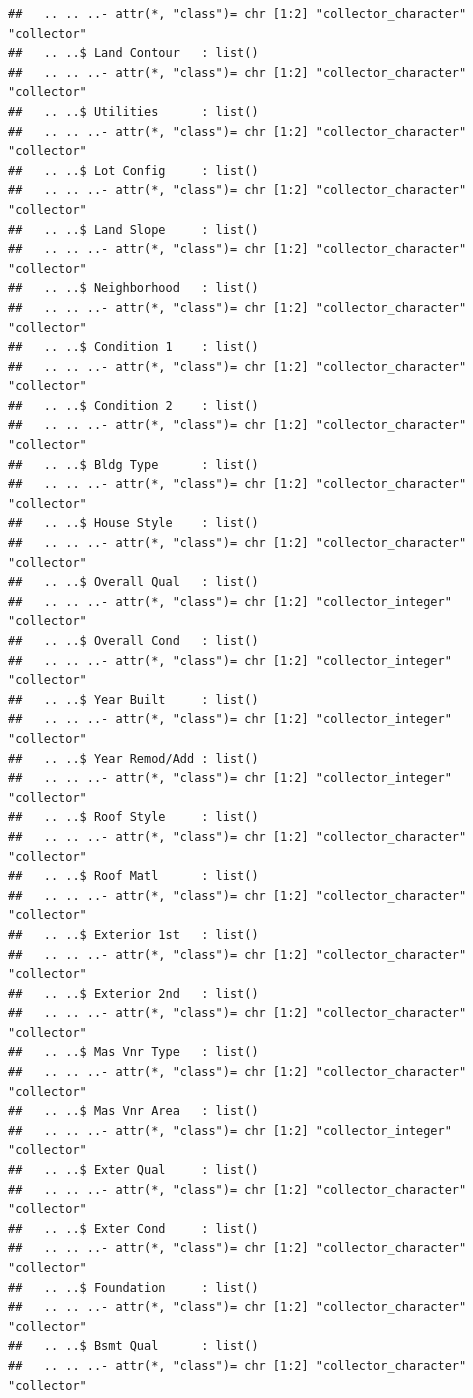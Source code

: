 \documentclass[
]{book}
\theoremstyle{definition}
\theoremstyle{definition}
\theoremstyle{definition}
\theoremstyle{definition}
\theoremstyle{remark}
\begin{document}
\begin{verbatim}
##   .. .. ..- attr(*, "class")= chr [1:2] "collector_character" "collector"
##   .. ..$ Land Contour   : list()
##   .. .. ..- attr(*, "class")= chr [1:2] "collector_character" "collector"
##   .. ..$ Utilities      : list()
##   .. .. ..- attr(*, "class")= chr [1:2] "collector_character" "collector"
##   .. ..$ Lot Config     : list()
##   .. .. ..- attr(*, "class")= chr [1:2] "collector_character" "collector"
##   .. ..$ Land Slope     : list()
##   .. .. ..- attr(*, "class")= chr [1:2] "collector_character" "collector"
##   .. ..$ Neighborhood   : list()
##   .. .. ..- attr(*, "class")= chr [1:2] "collector_character" "collector"
##   .. ..$ Condition 1    : list()
##   .. .. ..- attr(*, "class")= chr [1:2] "collector_character" "collector"
##   .. ..$ Condition 2    : list()
##   .. .. ..- attr(*, "class")= chr [1:2] "collector_character" "collector"
##   .. ..$ Bldg Type      : list()
##   .. .. ..- attr(*, "class")= chr [1:2] "collector_character" "collector"
##   .. ..$ House Style    : list()
##   .. .. ..- attr(*, "class")= chr [1:2] "collector_character" "collector"
##   .. ..$ Overall Qual   : list()
##   .. .. ..- attr(*, "class")= chr [1:2] "collector_integer" "collector"
##   .. ..$ Overall Cond   : list()
##   .. .. ..- attr(*, "class")= chr [1:2] "collector_integer" "collector"
##   .. ..$ Year Built     : list()
##   .. .. ..- attr(*, "class")= chr [1:2] "collector_integer" "collector"
##   .. ..$ Year Remod/Add : list()
##   .. .. ..- attr(*, "class")= chr [1:2] "collector_integer" "collector"
##   .. ..$ Roof Style     : list()
##   .. .. ..- attr(*, "class")= chr [1:2] "collector_character" "collector"
##   .. ..$ Roof Matl      : list()
##   .. .. ..- attr(*, "class")= chr [1:2] "collector_character" "collector"
##   .. ..$ Exterior 1st   : list()
##   .. .. ..- attr(*, "class")= chr [1:2] "collector_character" "collector"
##   .. ..$ Exterior 2nd   : list()
##   .. .. ..- attr(*, "class")= chr [1:2] "collector_character" "collector"
##   .. ..$ Mas Vnr Type   : list()
##   .. .. ..- attr(*, "class")= chr [1:2] "collector_character" "collector"
##   .. ..$ Mas Vnr Area   : list()
##   .. .. ..- attr(*, "class")= chr [1:2] "collector_integer" "collector"
##   .. ..$ Exter Qual     : list()
##   .. .. ..- attr(*, "class")= chr [1:2] "collector_character" "collector"
##   .. ..$ Exter Cond     : list()
##   .. .. ..- attr(*, "class")= chr [1:2] "collector_character" "collector"
##   .. ..$ Foundation     : list()
##   .. .. ..- attr(*, "class")= chr [1:2] "collector_character" "collector"
##   .. ..$ Bsmt Qual      : list()
##   .. .. ..- attr(*, "class")= chr [1:2] "collector_character" "collector"

\end{verbatim}
\end{document}
